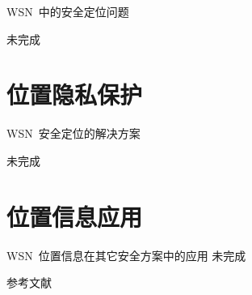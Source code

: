 \documentclass[mathserif,compress,CJKutf8, red]{beamer}
\begin{document}
\begin{CJK*}{UTF8}{song}
\begin{frame}{WSN~中的安全定位问题}

未完成
\end{frame}

\section{位置隐私保护}

\begin{frame}{WSN~安全定位的解决方案}

未完成
\end{frame}

\section{位置信息应用}

\begin{frame}{WSN~位置信息在其它安全方案中的应用}
未完成
\end{frame}

\begin{frame}{参考文献}


\end{frame}
\end{CJK*}
\end{document}
